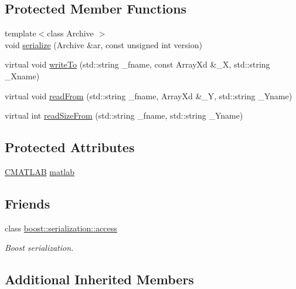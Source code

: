 \subsection*{Protected Member Functions}
\begin{DoxyCompactItemize}
\item 
{\footnotesize template$<$class Archive $>$ }\\void \hyperlink{class_go_s_u_m_1_1_c_exe_mat_evaluator_a2e5121b751aaeb6f5c805cfe0312c20d}{serialize} (Archive \&ar, const unsigned int version)
\item 
virtual void \hyperlink{class_go_s_u_m_1_1_c_exe_mat_evaluator_abf90e8ece5e782c8a60cbd0021e3dfa1}{write\-To} (std\-::string \-\_\-fname, const Array\-Xd \&\-\_\-\-X, std\-::string \-\_\-\-Xname)
\item 
virtual void \hyperlink{class_go_s_u_m_1_1_c_exe_mat_evaluator_ac47387e84bc69c1e39fbe43b15465473}{read\-From} (std\-::string \-\_\-fname, Array\-Xd \&\-\_\-\-Y, std\-::string \-\_\-\-Yname)
\item 
virtual int \hyperlink{class_go_s_u_m_1_1_c_exe_mat_evaluator_a84e80ccc1d62a41f3d7881e125bee446}{read\-Size\-From} (std\-::string \-\_\-fname, std\-::string \-\_\-\-Yname)
\end{DoxyCompactItemize}
\subsection*{Protected Attributes}
\begin{DoxyCompactItemize}
\item 
\hyperlink{class_c_m_a_t_l_a_b}{C\-M\-A\-T\-L\-A\-B} \hyperlink{class_go_s_u_m_1_1_c_exe_mat_evaluator_a23d92a4142a9809c0acd60dfbb33b629}{matlab}
\end{DoxyCompactItemize}
\subsection*{Friends}
\begin{DoxyCompactItemize}
\item 
class \hyperlink{class_go_s_u_m_1_1_c_exe_mat_evaluator_ac98d07dd8f7b70e16ccb9a01abf56b9c}{boost\-::serialization\-::access}
\begin{DoxyCompactList}\small\item\em Boost serialization. \end{DoxyCompactList}\end{DoxyCompactItemize}
\subsection*{Additional Inherited Members}


